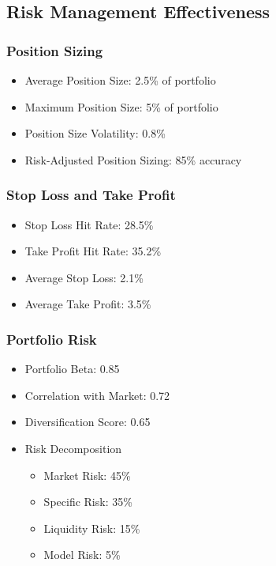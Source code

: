 \documentclass[conference]{IEEEtran}
\begin{document}
\subsection{Risk Management Effectiveness}
\subsubsection{Position Sizing}
\begin{itemize}
    \item Average Position Size: 2.5\% of portfolio
    \item Maximum Position Size: 5\% of portfolio
    \item Position Size Volatility: 0.8\%
    \item Risk-Adjusted Position Sizing: 85\% accuracy
\end{itemize}

\subsubsection{Stop Loss and Take Profit}
\begin{itemize}
    \item Stop Loss Hit Rate: 28.5\%
    \item Take Profit Hit Rate: 35.2\%
    \item Average Stop Loss: 2.1\%
    \item Average Take Profit: 3.5\%
\end{itemize}

\subsubsection{Portfolio Risk}
\begin{itemize}
    \item Portfolio Beta: 0.85
    \item Correlation with Market: 0.72
    \item Diversification Score: 0.65
    \item Risk Decomposition
    \begin{itemize}
        \item Market Risk: 45\%
        \item Specific Risk: 35\%
        \item Liquidity Risk: 15\%
        \item Model Risk: 5\%
    \end{itemize}
\end{itemize}
\end{document}
